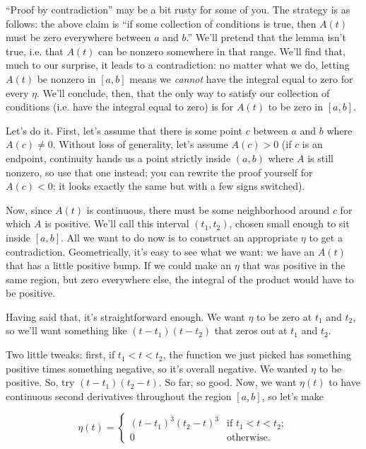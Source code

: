 \documentclass[12pt]{article}
\numberwithin{equation}{section}
\begin{document}
``Proof by contradiction'' may be a bit rusty for some of you. The
strategy is as follows: the above claim is ``if some collection of
conditions is true, then $A(t)$ must be zero everywhere between $a$ and
$b$.'' We'll pretend that the lemma isn't true, i.e. that $A(t)$ can
be nonzero somewhere in that range. We'll find that, much to our
surprise, it leads to a contradiction: no matter what we do, letting
$A(t)$ be nonzero in $[a,b]$ means we {\it cannot} have the
integral equal to zero for every $\eta$. We'll conclude, then, that the only way to
satisfy our collection of conditions (i.e. have the integral equal to
zero) is for $A(t)$ to be zero in $[a,b]$.

Let's do it. First, let's assume that there is some point $c$ between
$a$ and $b$ where $A(c) \neq 0$. Without loss of generality, let's
assume $A(c) > 0$ (if $c$ is an endpoint, continuity hands us a point strictly inside $(a,b)$ where $A$ is still nonzero, so use that one instead; you can rewrite the proof yourself for $A(c) < 0$;
it looks exactly the same but with a few signs switched).

Now, since $A(t)$ is continuous, there must be some neighborhood
around $c$ for which $A$ is positive. We'll call this interval
$(t_1,t_2)$, chosen small enough to sit inside $[a,b]$. All we want to do now is to construct an appropriate $\eta$
to get a contradiction. Geometrically, it's easy to see what we want:
we have an $A(t)$ that has a little positive bump. If we could make an
$\eta$ that was positive in the same region, but zero everywhere else,
the integral of the product would have to be positive.

Having said that, it's straightforward enough. We want $\eta$ to be
zero at $t_1$ and $t_2$, so we'll want something like $(t - t_1)(t - t_2)$
that zeros out at $t_1$ and $t_2$. 

Two little tweaks: first, if $t_1 < t < t_2$, the function we just
picked has something positive times something negative, so it's
overall negative. We wanted $\eta$ to be positive. So, try $(t -
t_1)(t_2 - t)$. So far, so good. Now, we want $\eta(t)$ to have
continuous second derivatives throughout the region $[a,b]$, so let's
make

\[ \eta(t) = \left\{ \begin{array}{ll}
         (t-t_1)^3(t_2-t)^3 & \mbox{if $t_1 < t < t_2$};\\
        0 & \mbox{otherwise}.\end{array} \right. \] 
\end{document}
